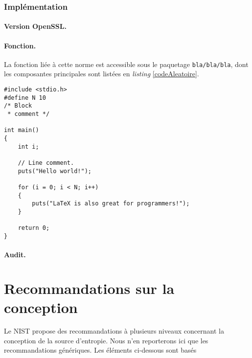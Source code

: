 	\subsubsection{Implémentation}
		
		\paragraph{Version OpenSSL.\\}
		
		\paragraph{Fonction.\\}
		La fonction liée à cette norme est accessible sous le paquetage \texttt{bla/bla/bla}, dont les composantes principales sont listées en \textit{listing} \ref{codeAleatoire}.
		
		
		\begin{lstlisting}[style=customc,caption=codeAleatoire.c, label=codeAleatoire]
#include <stdio.h>
#define N 10
/* Block
 * comment */
 
int main()
{
    int i;
 
    // Line comment.
    puts("Hello world!");
 
    for (i = 0; i < N; i++)
    {
        puts("LaTeX is also great for programmers!");
    }
 
    return 0;
}
		\end{lstlisting}
		
		
		
		\paragraph{Audit.\\}



\section{Recommandations sur la conception}
Le NIST propose des recommandations à plusieurs niveaux concernant la conception de la source d'entropie. Nous n'en reporterons ici que les recommandations génériques. Les éléments ci-dessous sont basés 

